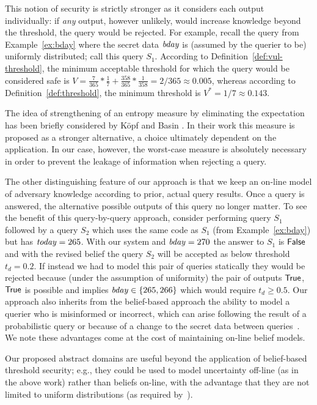 This notion of security is strictly stronger as it considers each
output individually: if \emph{any} output, however unlikely, would
increase knowledge beyond the threshold, the query would be rejected.
For example, recall the query from Example~\ref{ex:bday} where the
secret data $\mathit{bday}$ is (assumed by the querier to be) uniformly
distributed; call this query $S_1$.  According to
Definition~\ref{def:vul-threshold}, the minimum acceptable threshold
for which the query would be considered safe is $ V = \frac{7}{365} *
\frac{1}{7} + \frac{358}{365} * \frac{1}{358} = 2/365 \approx 0.005$,
whereas according to Definition~\ref{def:threshold}, the minimum
threshold is $ V^* = 1/7 \approx 0.143$.

The idea of strengthening of an entropy measure by eliminating the
expectation has been briefly considered by K{\"o}pf and Basin
\cite{koepfbasin07}. In their work this measure is proposed as a
stronger alternative, a choice ultimately dependent on the
application. In our case, however, the worst-case measure is
absolutely necessary in order to prevent the leakage of information
when rejecting a query.

The other distinguishing feature of our approach is that we keep an on-line model of
adversary knowledge according to prior, actual query results. Once a
query is answered, the alternative possible outputs of this query no
longer matter. To see the benefit of this
query-by-query approach, consider performing query $S_1$ followed by a
query $S_2$ which uses the same code as $S_1$ (from Example~\ref{ex:bday}) but has
$\mathit{today} = 265$.  With our system and $\mathit{bday} = 270$ the
answer to $S_1$ is $\mathsf{False}$ and with the revised belief the query
$S_2$ will be accepted as below threshold $t_d = 0.2$.  If instead we
had to model this pair of queries statically they would be rejected
because (under the assumption of uniformity) the pair of outputs
$\mathsf{True}$,$\mathsf{True}$ is possible and implies $\mathit{bday} \in \{ 265, 266
\}$ which would require $t_d \geq 0.5$.  Our approach also inherits
from the belief-based approach the ability to model a querier who is
misinformed or incorrect, which can arise following the result of a
probabilistic query or because of a change to the secret data between
queries~\cite{clarkson09quantifying}.
We note these advantages come at the cost
of maintaining on-line belief models.

Our proposed abstract domains are useful beyond the application of
belief-based threshold security; e.g., they could be used to model
uncertainty off-line (as in the above work) rather than beliefs
on-line, with the advantage that they are not limited to uniform
distributions (as required
by~\cite{backes09automatic,kopf:rybalchenko}).

